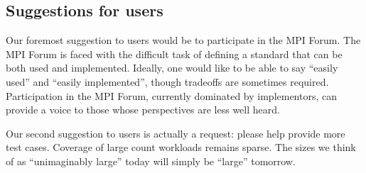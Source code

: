 \subsection{Suggestions for users}

Our foremost suggestion to users would be to participate in the MPI Forum.  The
MPI Forum is faced with the difficult task of defining a standard that can be
both used and implemented.  Ideally, one would like to be able to say ``easily
used'' and ``easily implemented'', though tradeoffs are sometimes required.
Participation in the MPI Forum, currently dominated by implementors, can
provide a voice to those whose perspectives are less well heard.

Our second suggestion to users is actually a request: please help provide more
test cases.  Coverage of large count workloads remains sparse.  The sizes we
think of as ``unimaginably large'' today will simply be ``large'' tomorrow.
